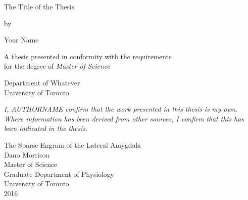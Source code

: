 \documentclass[12pt,a4paperpaper,]{report}
\date{}
\begin{document}
\begin{titlepage}
    \begin{center}

    
   
        
        \vspace*{2.5cm}
        
        \huge
        The Title of the Thesis
        
        \vspace{1.5cm}

        by
        \vspace{1.5cm}
        
        \Large
        Your Name

        \vspace{1.5cm}

        \normalsize
        A thesis presented in conformity with the requirements\\
        for the degree of \textit{Master of Science}
        
        \vfill
        
        \normalsize
        Department of Whatever\\
        University of Toronto

        \vspace{0.8cm}


    \end{center}
\end{titlepage}

\vspace*{\fill}

\noindent  \textit{
I, AUTHORNAME confirm that the work presented in this thesis is my own. Where information has been derived from other sources, I confirm that this has been indicated in the thesis.
} \vspace*{\fill}

\begin{center}
\Large
      The Sparse Engram of the Lateral Amygdala\\[2ex]
      Dano Morrison\\
      Master of Science\\
      Graduate Department of Physiology\\
      University of Toronto\\
      2016\\
\end{center}
\end{document}
